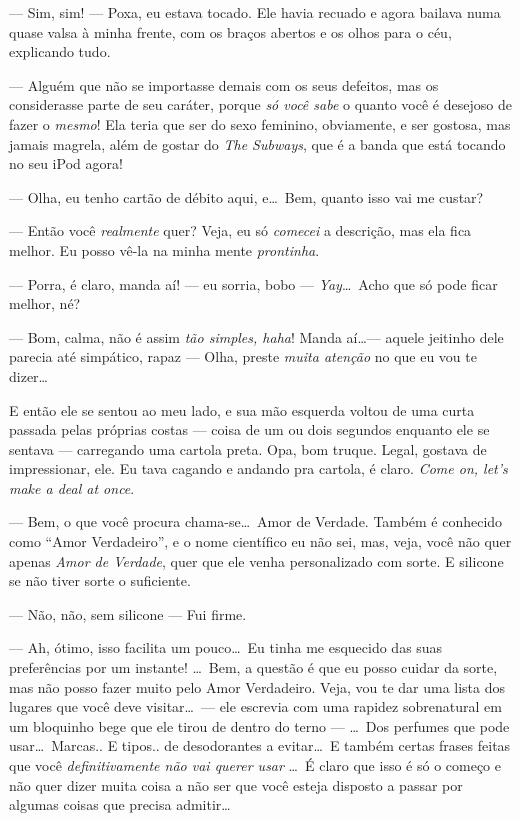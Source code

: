 --- Sim, sim! --- Poxa, eu estava tocado. Ele havia recuado e agora bailava numa quase valsa à minha frente, com os braços abertos e os olhos para o céu, explicando tudo.

--- Alguém que não se importasse demais com os seus defeitos, mas os considerasse parte de seu caráter, porque \emph{só você sabe} o quanto você é desejoso de fazer o \emph{mesmo}! Ela teria que ser do sexo feminino, obviamente, e ser gostosa, mas jamais magrela, além de gostar do \emph{The Subways}, que é a banda que está tocando no seu iPod agora!

--- Olha, eu tenho cartão de débito aqui, e\ldots \ Bem, quanto isso vai me custar?

--- Então você \emph{realmente} quer? Veja, eu só \emph{comecei} a descrição, mas ela fica melhor. Eu posso vê-la na minha mente \emph{prontinha}.

--- Porra, é claro, manda aí! --- eu sorria, bobo --- \emph{Yay}\ldots \ Acho que só pode ficar melhor, né?

--- Bom, calma, não é assim \emph{tão simples, haha}! Manda aí\ldots --- aquele jeitinho dele parecia até simpático, rapaz --- Olha, preste \emph{muita atenção} no que eu vou te dizer\ldots

E então ele se sentou ao meu lado, e sua mão esquerda voltou de uma curta passada pelas próprias costas --- coisa de um ou dois segundos enquanto ele se sentava --- carregando uma cartola preta. Opa, bom truque. Legal, gostava de impressionar, ele. Eu tava cagando e andando pra cartola, é claro. \emph{Come on, let’s make a deal at once}.

--- Bem, o que você procura chama-se\ldots \ Amor de Verdade. Também é conhecido como ``Amor Verdadeiro'', e o nome científico eu não sei, mas, veja, você não quer apenas \emph{Amor de Verdade}, quer que ele venha personalizado com sorte. E silicone se não tiver sorte o suficiente.

--- Não, não, sem silicone --- Fui firme.

--- Ah, ótimo, isso facilita um pouco\ldots \ Eu tinha me esquecido das suas preferências por um instante! \ldots \ Bem, a questão é que eu posso cuidar da sorte, mas não posso fazer muito pelo Amor Verdadeiro. Veja, vou te dar uma lista dos lugares que você deve visitar\ldots \ --- ele escrevia com uma rapidez sobrenatural em um bloquinho bege que ele tirou de dentro do terno ---  \ldots \ Dos perfumes que pode usar\ldots \ Marcas.. E tipos.. de desodorantes a evitar\ldots \ E também certas frases feitas que você \emph{definitivamente não vai querer usar} \ldots \ É claro que isso é só o começo e não quer dizer muita coisa a não ser que você esteja disposto a passar por algumas coisas que precisa admitir\ldots

